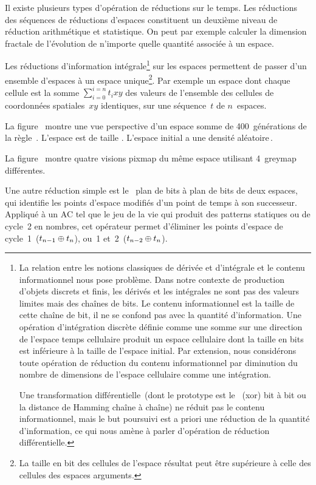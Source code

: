 Il existe plusieurs types d'opération de réductions sur le temps. %
Les réductions des séquences de réductions d'espaces constituent un
deuxième niveau de réduction arithmétique et statistique. %
On peut par exemple calculer la dimension fractale de l'évolution de
n'importe quelle quantité associée à un espace. %

Les réductions d'information intégrale\footnote{%
  La relation entre les notions classiques de dérivée et d'intégrale et
  le contenu informationnel nous pose problème. %
  Dans notre contexte de production d'objets discrets et finis, %
  les dérivés et les intégrales ne sont pas des valeurs limites
  mais des chaînes de bits. %
  Le contenu informationnel est la taille de cette chaîne de bit, il
  ne se confond pas avec la quantité d'information. %
  Une opération d'intégration discrète définie comme une somme sur une
  direction de l'espace temps cellulaire produit un espace cellulaire
  dont la taille en bits est inférieure à la taille de l'espace
  initial. %
  Par extension, nous considérons toute opération de réduction du
  contenu informationnel par diminution du nombre de dimensions de
  l'espace cellulaire comme une intégration. %
  
  Une transformation différentielle~(dont le prototype est le \xor~(xor) bit
  à bit ou la distance de Hamming chaîne à chaîne) ne réduit pas le
  contenu informationnel, mais le but poursuivi est a priori une
  réduction de la quantité d'information, ce qui nous amène à parler
  d'opération de réduction différentielle.}%
sur les espaces permettent de passer d'un ensemble d'espaces à un
espace unique\footnote{%
  La taille en bit des cellules de l'espace résultat peut être
  supérieure à celle des cellules des espaces arguments.}. %
Par exemple un espace dont chaque cellule est la somme
$\sum_{i=0}^{i=n}t_{i}xy$ des valeurs de l'ensemble des cellules de
coordonnées spatiales~$xy$ identiques, sur une séquence~$t$ de $n$~espaces. %

\noindent%
La figure~ montre une vue perspective d'un
espace somme de 400~géné\-rations de la règle~. %
L'espace est de taille . %
L'espace initial a une densité aléatoire\,\undemi. %

\noindent%
La figure~ montre quatre visions pixmap
du même espace utilisant 4~greymap différentes. %

Une autre réduction simple est le \xor\ plan de bits à plan de bits de
deux espaces, qui identifie les points d'espace modifiés d'un point de
temps à son successeur. %
Appliqué à un AC tel que le jeu de la vie qui produit des patterns
statiques ou de cycle~2 en nombres, cet
opérateur permet d'éliminer les points d'espace %
de cycle~1~($t_{n-1} \oplus t_{n}$),
ou~1 et~2~($t_{n-2} \oplus t_{n}$). %

